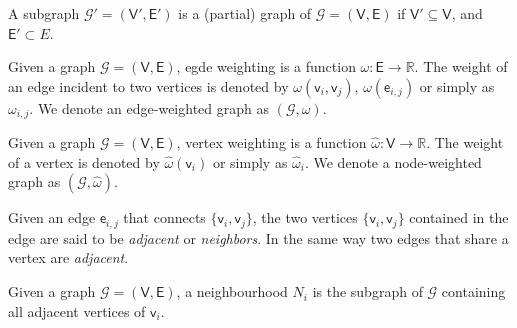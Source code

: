 \begin{definition}[Subgraph]
	A subgraph $\mathcal{G}'= (\mathsf{V}', \mathsf{E}')$ is a (partial) graph of $\mathcal{G}=(\mathsf{V}, \mathsf{E})$ if $\mathsf{V}' \subseteq \mathsf{V}$, and  $\mathsf{E}'\subset E$.
\end{definition}

\begin{definition}
	Given a graph $\mathcal{G}=(\mathsf{V}, \mathsf{E})$, egde weighting is a function $\omega: \mathsf{E} \rightarrow \mathbb{R}$. The weight of an edge incident to two vertices is denoted by  $\omega(\mathsf{v}_{i}, \mathsf{v}_{j})$, $ \omega(\mathsf{e}_{i,j})$ or simply as $\omega_{i,j}$. We denote an edge-weighted graph as $(\mathcal{G}, \omega)$.
\end{definition}

\begin{definition}
	Given a graph $\mathcal{G}=(\mathsf{V}, \mathsf{E})$, vertex weighting is a function $\hat{\omega}: \mathsf{V} \rightarrow \mathbb{R}$. The weight of a vertex is denoted by  $\hat{\omega}(\mathsf{v}_{i})$ or simply as $\hat{\omega}_{i}$. We denote a node-weighted graph as $(\mathcal{G}, \hat{\omega})$.
\end{definition}

\begin{definition}[Adjacency]
	Given an edge $\mathsf{e}_{i,j}$ that connects $\{\mathsf{v}_{i}, \mathsf{v}_{j}\}$, the two vertices $\{\mathsf{v}_{i}, \mathsf{v}_{j}\}$ contained in the edge are said to be \textit{adjacent} or \textit{neighbors}. In the same way two edges that share a vertex are \textit{adjacent}.
\end{definition}

\begin{definition}[Neighborhood]
	Given a graph $\mathcal{G}=(\mathsf{V}, \mathsf{E})$, a neighbourhood $N_i$ is the subgraph of $\mathcal{G}$ containing all adjacent vertices of $\mathsf{v}_i$.
\end{definition}

